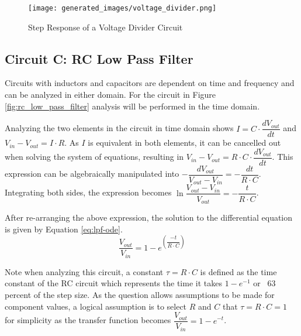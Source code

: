 \documentclass[main.tex]{subfiles}
\begin{document}
\begin{figure}[H]
    \centering
    \texttt{[image: generated\_images/voltage\_divider.png]}
    \caption{Step Response of a Voltage Divider Circuit}
    \label{fig:step-response-voltage-divider}
\end{figure}

\subsection{Circuit C: RC Low Pass Filter}
Circuits with inductors and capacitors are dependent on time and frequency and can be analyzed in either domain. For the circuit in Figure \ref{fig:rc_low_pass_filter} analysis will be performed in the time domain. \newline

\newnoindentpara Analyzing the two elements in the circuit in time domain shows $I = C \cdot \dfrac{dV_{out}}{dt}$ and $V_{in} - V_{out} = I \cdot R$. As $I$ is equivalent in both elements, it can be cancelled out when solving the system of equations, resulting in $V_{in} - V_{out} = R \cdot C \cdot \dfrac{dV_{out}}{dt}$. This expression can be algebraically manipulated into $-\dfrac{dV_{out}}{V_{out}-V_{in}} = -\dfrac{dt}{R \cdot C}$. Integrating both sides, the expression becomes $\ln{\dfrac{V_{out}-V_{in}}{V_{out}}}=-\dfrac{t}{R \cdot C}$. \newline 

\newnoindentpara After re-arranging the above expression, the solution to the differential equation is given by Equation \ref{eq:lpf-ode}.
\begin{equation}
    \dfrac{V_{out}}{V_{in}} = 1-e^{\left( \dfrac{-t}{R \cdot C} \right)}
    \label{eq:lpf-ode}
\end{equation}

\noindent Note when analyzing this circuit, a constant $\tau = R \cdot C$ is defined as the time constant of the RC circuit which represents the time it takes $1-e^{-1}$ or ~63 percent of the step size. As the question allows assumptions to be made for component values, a logical assumption is to select $R$ and $C$ that $\tau = R \cdot C = 1$ for simplicity as the transfer function becomes $\dfrac{V_{out}}{V_{in}} = 1-e^{-t}$.
\end{document}
